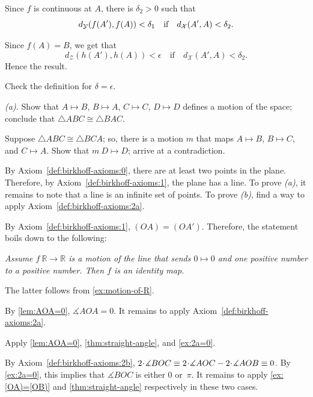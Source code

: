 Since $f$ is continuous at $A$, there is $\delta_2>0$ such that 
$$d_{\mathcal{Y}}(f(A'),f(A))\z<\delta_1
\quad
\text{if}
\quad
d_{\mathcal{X}}(A',A)<\delta_2.$$ 

Since $f(A)=B$, we get that
$$d_{\mathcal{Z}}(h(A'),h(A))<\epsilon
\quad
\text{if}
\quad
d_{\mathcal{X}}(A',A)<\delta_2.$$ 
Hence the result.

Check the definition for $\delta=\epsilon$.

 \textit{(a).}
Show that $A\mapsto B$, $B\mapsto A$, $C\mapsto C$, $D\mapsto D$ defines a motion of the space;
conclude that $\triangle ABC\cong \triangle BAC$.

 Suppose $\triangle ABC\cong \triangle BCA$; so, there is a motion $m$ that maps $A\mapsto B$, $B\mapsto C$, and $C\mapsto A$.
Show that $m\:D\mapsto D$; arrive at a contradiction.


\setcounter{eqtn}{0}

 By Axiom~\ref{def:birkhoff-axioms:0}, there are at least two points in the plane.
Therefore, by Axiom~\ref{def:birkhoff-axioms:1}, 
the plane has a line.
To prove \textit{(a)}, it remains to note that a line is an infinite set of points.
To prove \textit{(b)}, find a way to apply Axiom~\ref{def:birkhoff-axioms:2a}.

\parbf{\ref{ex:[OA)=[OA')}.}
By Axiom~\ref{def:birkhoff-axioms:1},
$(OA)=(OA')$.
Therefore, the statement boils down to the following:

\textit{Assume $f\:\mathbb{R}\to \mathbb{R}$ is a motion of the line that sends $0\mapsto 0$ and one positive number to a positive number.
Then $f$ is an identity map.}

The latter follows from \ref{ex:motion-of-R}.

\parbf{\ref{ex:[OA)=[OB)}.}
By \ref{lem:AOA=0},
$\measuredangle AOA=0$.
It remains to apply Axiom~\ref{def:birkhoff-axioms:2a}.

Apply \ref{lem:AOA=0},
\ref{thm:straight-angle},
and \ref{ex:2a=0}.

By Axiom~\ref{def:birkhoff-axioms:2b},
$2\cdot\measuredangle BOC
\equiv 
2\cdot\measuredangle AOC\z-2\cdot \measuredangle AOB
\equiv 0$.
By \ref{ex:2a=0}, 
this implies that 
$\measuredangle BOC$ is either $0$ or~$\pi$.
It remains to apply \ref{ex:[OA)=[OB)} and \ref{thm:straight-angle} respectively in these two cases.

